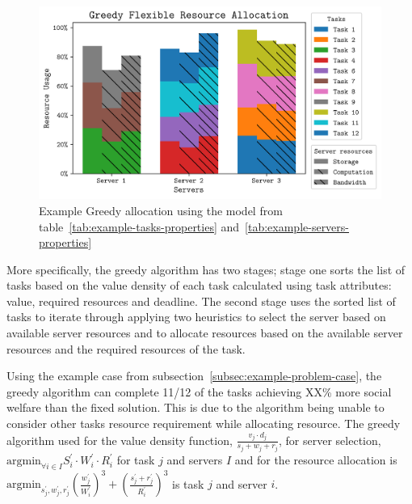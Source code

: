 \begin{figure}
    \centering
    \includegraphics[width=\linewidth]{figs/allocation/greedy_flexible_resource_allocation.png}
    \caption{Example Greedy allocation using the model from table~\ref{tab:example-tasks-properties}
    and~\ref{tab:example-servers-properties}}
    \label{fig:example-greedy-allocation}
\end{figure}

More specifically, the greedy algorithm has two stages; stage one sorts the list of tasks based on the value
density of each task calculated using task attributes: value, required resources and deadline. The second
stage uses the sorted list of tasks to iterate through applying two heuristics to select the server based on
available server resources and to allocate resources based on the available server resources and the required resources
of the task.

Using the example case from subsection~\ref{subsec:example-problem-case}, the greedy algorithm can complete 11/12 of
the tasks achieving XX\% more social welfare than the fixed solution. This is due to the algorithm being unable to %
consider other tasks resource requirement while allocating resource. The greedy algorithm used for the value density
function, $\frac{v_j \cdot d_j}{s_j + w_j + r_j}$, for server selection, $\text{argmin}_{\forall i \in I} S^{'}_i \cdot W^{'}_i \cdot R^{'}_i$
for task $j$ and servers $I$ and for the resource allocation is
$\text{argmin}_{s^{'}_j, w^{'}_j, r^{'}_j} \left(\frac{w^{'}_j}{W^{'}_i}\right)^3 + \left(\frac{s^{'}_j + r^{'}_j}{R^{'}_i}\right)^3$
is task $j$ and server $i$.

